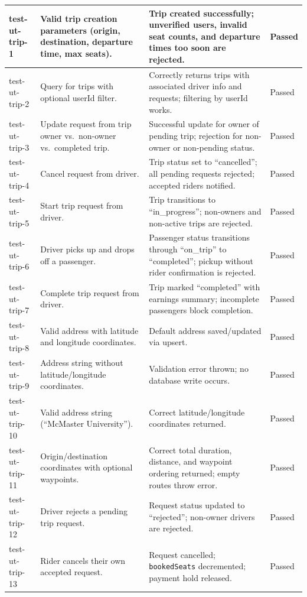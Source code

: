 \begin{longtable}{|p{}|>{\raggedright\arraybackslash}p{}|>{\raggedright\arraybackslash}p{}|p{}|}
test-ut-trip-1 & Valid trip creation parameters (origin, destination, departure time, max seats). & Trip created successfully; unverified users, invalid seat counts, and departure times too soon are rejected. & Passed \\
\hline
test-ut-trip-2 & Query for trips with optional userId filter. & Correctly returns trips with associated driver info and requests; filtering by userId works. & Passed \\
\hline
test-ut-trip-3 & Update request from trip owner vs.\ non-owner vs.\ completed trip. & Successful update for owner of pending trip; rejection for non-owner or non-pending status. & Passed \\
\hline
test-ut-trip-4 & Cancel request from driver. & Trip status set to ``cancelled''; all pending requests rejected; accepted riders notified. & Passed \\
\hline
test-ut-trip-5 & Start trip request from driver. & Trip transitions to ``in\_progress''; non-owners and non-active trips are rejected. & Passed \\
\hline
test-ut-trip-6 & Driver picks up and drops off a passenger. & Passenger status transitions through ``on\_trip'' to ``completed''; pickup without rider confirmation is rejected. & Passed \\
\hline
test-ut-trip-7 & Complete trip request from driver. & Trip marked ``completed'' with earnings summary; incomplete passengers block completion. & Passed \\
\hline
test-ut-trip-8 & Valid address with latitude and longitude coordinates. & Default address saved/updated via upsert. & Passed \\
\hline
test-ut-trip-9 & Address string without latitude/longitude coordinates. & Validation error thrown; no database write occurs. & Passed \\
\hline
test-ut-trip-10 & Valid address string (``McMaster University''). & Correct latitude/longitude coordinates returned. & Passed \\
\hline
test-ut-trip-11 & Origin/destination coordinates with optional waypoints. & Correct total duration, distance, and waypoint ordering returned; empty routes throw error. & Passed \\
\hline
test-ut-trip-12 & Driver rejects a pending trip request. & Request status updated to ``rejected''; non-owner drivers are rejected. & Passed \\
\hline
test-ut-trip-13 & Rider cancels their own accepted request. & Request cancelled; \texttt{bookedSeats} decremented; payment hold released. & Passed \\

\end{longtable}
